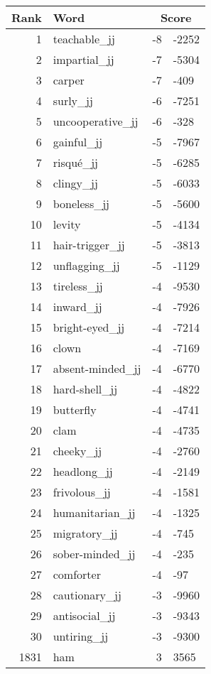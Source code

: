 \begin{longtable}[!htbp]{| rlr@{.}l |}
    \hline
    \textbf{Rank} & \textbf{Word} & \multicolumn{2}{c|}{\textbf{Score}} \\
    \hline
    \endhead
    1 & teachable\_jj & -8 & -2252 \\
    2 & impartial\_jj & -7 & -5304 \\
    3 & carper & -7 & -409 \\
    4 & surly\_jj & -6 & -7251 \\
    5 & uncooperative\_jj & -6 & -328 \\
    6 & gainful\_jj & -5 & -7967 \\
    7 & risqué\_jj & -5 & -6285 \\
    8 & clingy\_jj & -5 & -6033 \\
    9 & boneless\_jj & -5 & -5600 \\
    10 & levity & -5 & -4134 \\
    11 & hair-trigger\_jj & -5 & -3813 \\
    12 & unflagging\_jj & -5 & -1129 \\
    13 & tireless\_jj & -4 & -9530 \\
    14 & inward\_jj & -4 & -7926 \\
    15 & bright-eyed\_jj & -4 & -7214 \\
    16 & clown & -4 & -7169 \\
    17 & absent-minded\_jj & -4 & -6770 \\
    18 & hard-shell\_jj & -4 & -4822 \\
    19 & butterfly & -4 & -4741 \\
    20 & clam & -4 & -4735 \\
    21 & cheeky\_jj & -4 & -2760 \\
    22 & headlong\_jj & -4 & -2149 \\
    23 & frivolous\_jj & -4 & -1581 \\
    24 & humanitarian\_jj & -4 & -1325 \\
    25 & migratory\_jj & -4 & -745 \\
    26 & sober-minded\_jj & -4 & -235 \\
    27 & comforter & -4 & -97 \\
    28 & cautionary\_jj & -3 & -9960 \\
    29 & antisocial\_jj & -3 & -9343 \\
    30 & untiring\_jj & -3 & -9300 \\
    1831 & ham & 3 & 3565 \\

\end{longtable}
